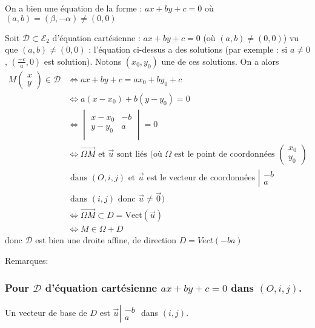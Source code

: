 \documentclass[12pt,a4paper,french]{book}
\begin{document}
			On a bien une équation de la forme : $ax + by + c = 0$ où $(a,b) = (\beta,-\alpha) \neq (0,0)$
			
			 Soit $\mathcal{D} \subset \mathcal{E}_2$ d'équation cartésienne : $ax + by+c = 0$ (où $(a,b) \neq (0,0)$) vu que $(a,b) \neq (0,0)$ : l'équation ci-dessus a des solutions (par exemple : si $a \neq 0$, $(\frac{-c}{a}, 0)$ est solution). Notons $(x_0,y_0)$ une de ces solutions. On a alors \begin{equation} \begin{split}
					M\begin{pmatrix} x\\ y \end{pmatrix} \in \mathcal{D} & \Leftrightarrow ax +by+c = ax_0 + by_0 + c \\ & \Leftrightarrow a(x-x_0) + b(y-y_0) = 0 \\ & \Leftrightarrow \begin{vmatrix}
						x-x_0 & -b\\ y-y_0 & a\\
					\end{vmatrix} = 0 \\ & \Leftrightarrow \overrightarrow{\Omega M} \mbox{ et } \overrightarrow{u}\mbox{ sont liés (où }\Omega \mbox{ est le point de coordonnées }\begin{pmatrix} x_0\\y_0 \end{pmatrix} \\ & \mbox{ dans }(O,i,j)\mbox{ et }\overrightarrow{u} \mbox{ est le vecteur de coordonnées }\left| \begin{array}{ll} -b\\a \end{array}\right. \\ & \mbox{ dans }(i,j)\mbox{ donc }\overrightarrow{u} \neq \overrightarrow{0}) \\ & \Leftrightarrow \overrightarrow{\Omega M} \subset D = \mbox{Vect}(\overrightarrow{u}) \\ & \Leftrightarrow M \in \Omega + D
				\end{split}
			\end{equation} donc $\mathcal{D}$ est bien une droite affine, de direction $D=Vect(-b a)$
			
			Remarques:
			\subsubsection{Pour $\mathcal{D}$ d'équation cartésienne $ax+by+c=0$ dans $(O,i,j)$.}
				 Un vecteur de base de $D$ est $\overrightarrow{u} \left| \begin{array}{ll} -b\\a \end{array}\right.$ dans $(i,j)$.
\end{document}
